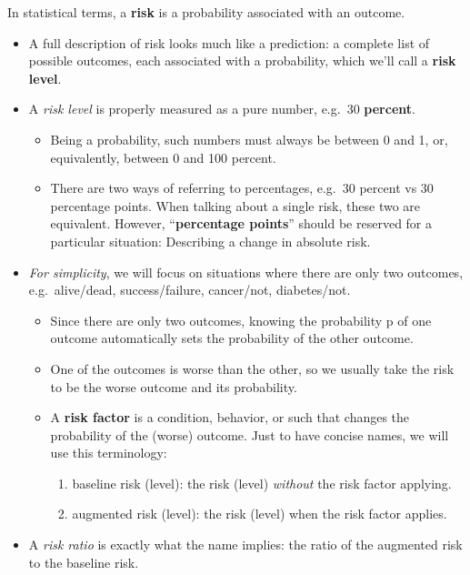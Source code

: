 \documentclass[
  letterpaper,
  DIV=11,
  numbers=noendperiod,
  oneside]{scrartcl}
\providecommand{\tightlist}{%
  \setlength{\itemsep}{0pt}\setlength{\parskip}{0pt}}\usepackage{longtable,booktabs,array}
\begin{document}
In statistical terms, a \textbf{risk} is a probability associated with
an outcome.

\begin{itemize}
\item
  A full description of risk looks much like a prediction: a complete
  list of possible outcomes, each associated with a probability, which
  we'll call a \textbf{risk level}.
\item
  A \emph{risk level} is properly measured as a pure number, e.g.~30
  \textbf{percent}.

  \begin{itemize}
  \tightlist
  \item
    Being a probability, such numbers must always be between 0 and 1,
    or, equivalently, between 0 and 100 percent.
  \item
    There are two ways of referring to percentages, e.g.~30 percent vs
    30 percentage points. When talking about a single risk, these two
    are equivalent. However, ``\textbf{percentage points}'' should be
    reserved for a particular situation: Describing a change in absolute
    risk.
  \end{itemize}
\item
  \emph{For simplicity}, we will focus on situations where there are
  only two outcomes, e.g.~alive/dead, success/failure, cancer/not,
  diabetes/not.

  \begin{itemize}
  \item
    Since there are only two outcomes, knowing the probability p of one
    outcome automatically sets the probability of the other outcome.
  \item
    One of the outcomes is worse than the other, so we usually take the
    risk to be the worse outcome and its probability.
  \item
    A \textbf{risk factor} is a condition, behavior, or such that
    changes the probability of the (worse) outcome. Just to have concise
    names, we will use this terminology:

    \begin{enumerate}
    \def\labelenumi{\roman{enumi}.}
    \tightlist
    \item
      baseline risk (level): the risk (level) \emph{without} the risk
      factor applying.
    \item
      augmented risk (level): the risk (level) when the risk factor
      applies.
    \end{enumerate}
  \end{itemize}
\item
  A \emph{risk ratio} is exactly what the name implies: the ratio of the
  augmented risk to the baseline risk.


\end{itemize}
\end{document}
